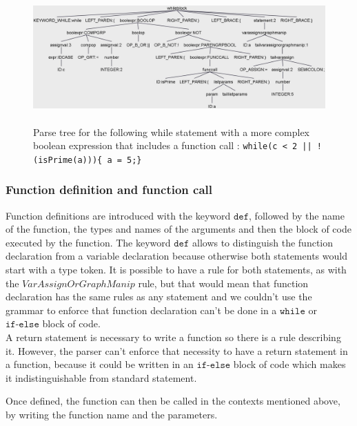 \begin{figure}[H]
    \centering
    \includegraphics[height = 5cm]{figures/parse_trees/parseTree_whileblock}
    \caption{Parse tree for the following while statement with a more complex boolean expression that includes a function call : \texttt{while(c < 2 || !(isPrime(a)))\{
        a = 5;\}}}
    \label{fig:parseTree_whileblock}
\end{figure}

\subsubsection*{Function definition and function call}

Function definitions are introduced with the keyword $\texttt{def}$, followed by the name of the function, the types and names of the arguments and then the block of code executed by the function.
The keyword $\texttt{def}$ allows to distinguish the function declaration from a variable declaration because otherwise both statements would start with a type token.
It is possible to have a rule for both statements, as with the $\mathit{VarAssignOrGraphManip}$ rule, but that would mean that function declaration has the same rules as any statement and we couldn't use the grammar to enforce that function declaration can't be done in a $\texttt{while}$ or $\texttt{if-else}$ block of code.\\

A return statement is necessary to write a function so there is a rule describing it.
However, the parser can't enforce that necessity to have a return statement in a function, because it could be written in an $\texttt{if-else}$ block of code which makes it indistinguishable from standard statement.

Once defined, the function can then be called in the contexts mentioned above, by writing the function name and the parameters.

